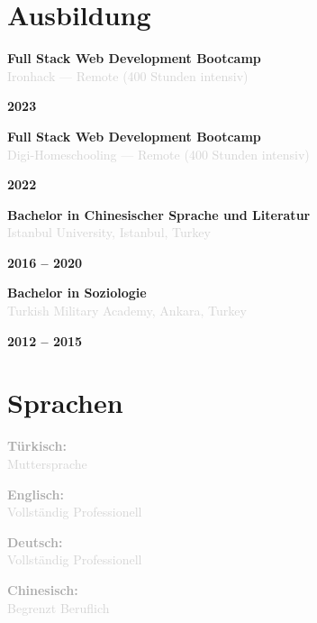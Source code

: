 \documentclass[10pt,a4paper]{article}
\newcommand{\Education}[3]{%
  \vspace{2pt}
  \noindent
  \begin{minipage}[t]{0.70\textwidth}
    {\normalsize\textbf{\color{darkgray}#1}} \\
    \textcolor{lightgray}{\small #2}
  \end{minipage}%
  \hfill
  \begin{minipage}[t]{0.28\textwidth}
    \raggedleft
    \textcolor{mediumgray}{\small\textbf{#3}}
  \end{minipage}
  \vspace{1pt}
}
\begin{document}
\section*{Ausbildung}

\Education{Full Stack Web Development Bootcamp}{Ironhack — Remote (400 Stunden intensiv)}{2023}

\Education{Full Stack Web Development Bootcamp}{Digi-Homeschooling — Remote (400 Stunden intensiv)}{2022}

\Education{Bachelor in Chinesischer Sprache und Literatur}{Istanbul University, Istanbul, Turkey}{2016 -- 2020}

\Education{Bachelor in Soziologie}{Turkish Military Academy, Ankara, Turkey}{2012 -- 2015}

\section*{Sprachen}

\vspace{1pt}
\noindent
\begin{minipage}[t]{0.24\textwidth}
  \textcolor{darkgray}{\textbf{Türkisch:}} \\
  \textcolor{lightgray}{\small Muttersprache}
\end{minipage}%
\hfill
\begin{minipage}[t]{0.24\textwidth}
  \textcolor{darkgray}{\textbf{Englisch:}} \\
  \textcolor{lightgray}{\small Vollständig Professionell}
\end{minipage}%
\hfill
\begin{minipage}[t]{0.24\textwidth}
  \textcolor{darkgray}{\textbf{Deutsch:}} \\
  \textcolor{lightgray}{\small Vollständig Professionell}
\end{minipage}%
\hfill
\begin{minipage}[t]{0.24\textwidth}
  \textcolor{darkgray}{\textbf{Chinesisch:}} \\
  \textcolor{lightgray}{\small Begrenzt Beruflich}
\end{minipage}
\end{document}
